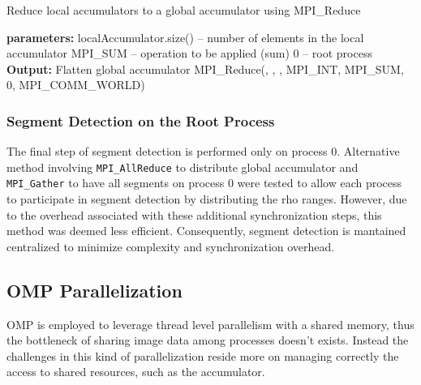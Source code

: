\documentclass[conference]{IEEEtran}
\begin{document}
            \begin{algorithm}
            \caption{Reduce local accumulators to a global accumulator using MPI\_Reduce}
            \label{alg::ht_pht_mpi_reduce}
            \begin{algorithmic}[1]
            \State \textbf{parameters:}
            \State \hspace{\algorithmicindent} localAccumulator.size() -- number of elements in the local accumulator
            \State \hspace{\algorithmicindent} MPI\_SUM -- operation to be applied (sum)
            \State \hspace{\algorithmicindent} 0 -- root process
            \State \textbf{Output:} Flatten global accumulator
                \State MPI\_Reduce(, , 
                , MPI\_INT, MPI\_SUM, 0, MPI\_COMM\_WORLD)
            \EndProcedure
            \end{algorithmic}
            \end{algorithm}

        \subsubsection{Segment Detection on the Root Process}
        
            The final step of segment detection is performed only on process 0. Alternative method involving \texttt{MPI\_AllReduce} to distribute global accumulator and \texttt{MPI\_Gather} to have all segments on process 0 were tested to allow each process to participate in segment detection by distributing the rho ranges. However, due to the overhead associated with these additional synchronization steps, this method was deemed less efficient. Consequently, segment detection is mantained centralized to minimize complexity and synchronization overhead.
            
    \subsection{OMP Parallelization}
    \label{subsec:OMP_parallelization}
    
        OMP is employed to leverage thread level parallelism with a shared memory, thus the bottleneck of sharing image data among processes doesn't exists. Instead the challenges in this kind of parallelization reside more on managing correctly the access to shared resources, such as the accumulator.
        
\end{document}
